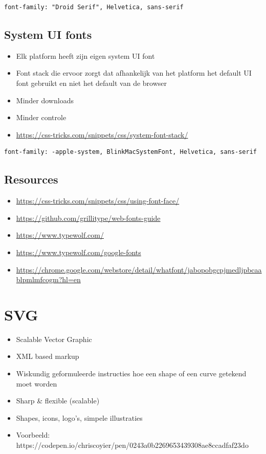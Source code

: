 \documentclass{article}
\begin{document}
\begin{lstlisting}
font-family: "Droid Serif", Helvetica, sans-serif
\end{lstlisting}

\subsection{System UI fonts}
\begin{itemize}
    \item Elk platform heeft zijn eigen system UI font
    \item Font stack die ervoor zorgt dat afhankelijk van het platform het default UI font gebruikt en niet het default van de browser
    \item Minder downloads 
    \item Minder controle
    \item \url{https://css-tricks.com/snippets/css/system-font-stack/}
\end{itemize}

\begin{lstlisting}
font-family: -apple-system, BlinkMacSystemFont, Helvetica, sans-serif
\end{lstlisting}

\subsection{Resources}
\begin{itemize}
    \item \url{https://css-tricks.com/snippets/css/using-font-face/}
    \item \url{https://github.com/grillitype/web-fonts-guide}
    \item \url{https://www.typewolf.com/}
    \item \url{https://www.typewolf.com/google-fonts}
    \item \url{https://chrome.google.com/webstore/detail/whatfont/jabopobgcpjmedljpbcaablpmlmfcogm?hl=en}
\end{itemize}

\section{SVG}
\begin{itemize}
    \item Scalable Vector Graphic
    \item XML based markup
    \item Wiskundig geformuleerde instructies hoe een shape of een curve getekend moet worden
    \item Sharp \& flexible (scalable)
    \item Shapes, icons, logo's, simpele illustraties
    \item Voorbeeld: https://codepen.io/chriscoyier/pen/0243a0b2269653439308ae8ccadfaf23do
\end{itemize}
\end{document}
